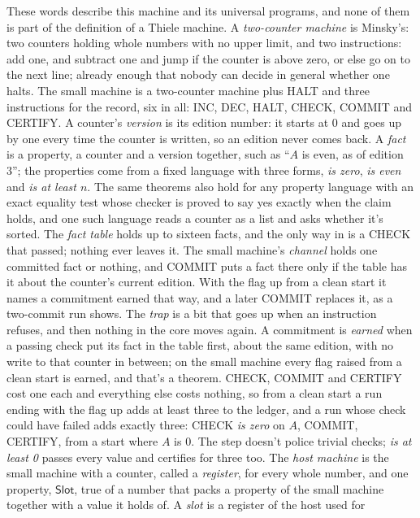 \documentclass[11pt,twoside]{article}
\theoremstyle{thielethm}
\theoremstyle{thieledef}
\theoremstyle{thieledef}
\theoremstyle{thieledef}
\theoremstyle{thielethm}
\theoremstyle{thieleobs}
\theoremstyle{thielethm}
\begin{document}
These words describe this machine and its universal programs, and none of them is part of the definition of a Thiele machine. A \emph{two-counter machine} is Minsky's: two
counters holding whole numbers with no upper limit, and two instructions: add one, and
subtract one and jump if the counter is above zero, or else go on to the next line; already enough that nobody can decide in general whether
one halts. The small machine is a two-counter machine plus HALT and three instructions for the
record, six in all: INC, DEC, HALT, CHECK, COMMIT and CERTIFY. A counter's \emph{version} is its
edition number: it starts at 0 and goes up by one every time the counter is written, so an
edition never comes back. A \emph{fact} is a property, a counter and a version together, such as
``$A$ is even, as of edition 3''; the properties come from a fixed language with three forms, \emph{is zero},
\emph{is even} and \emph{is at least $n$}. The same theorems also hold for any property language
with an exact
equality test whose checker is proved to say yes exactly when the claim holds, and one such language reads a counter as a list
and asks whether it's sorted. The \emph{fact table} holds up to sixteen facts, and the only way
in is a CHECK that passed; nothing ever leaves it. The small machine's \emph{channel} holds one
committed fact or nothing, and COMMIT puts a fact there only if the table has it about the
counter's current edition. With the flag up from a clean start it names a commitment earned
that way, and a later COMMIT
replaces it, as a two-commit run shows. The \emph{trap} is a bit that goes up when an instruction refuses, and
then nothing in the core moves again. A commitment is \emph{earned} when a passing check put its
fact in the table first, about the same edition, with no write to that counter in between; on
the small machine every flag raised from a clean start is earned, and that's a theorem.
CHECK, COMMIT and CERTIFY cost one each and everything else costs nothing,
so from a clean start a run ending with the flag up adds at least three to the ledger, and a run whose check could have failed adds exactly three: CHECK
\emph{is zero} on $A$, COMMIT, CERTIFY, from a start where $A$ is 0. The step doesn't police
trivial checks; \emph{is at least 0} passes every value and certifies for three too. The
\emph{host machine} is the small machine with a counter, called a \emph{register}, for every
whole number, and one property, $\mathsf{Slot}$, true of a number that packs a property of the
small machine together with a value it holds of. A \emph{slot} is a register of the host used for
\end{document}
